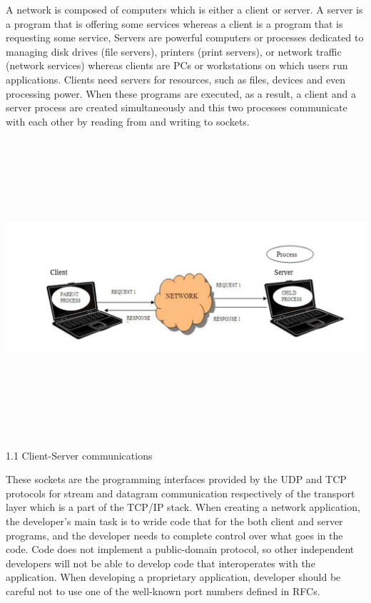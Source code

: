 \documentclass[12pt]{extarticle}
\begin{document}
A network is composed  of computers which is either a client or server. A server is a program that
is offering some services whereas a client is a program that is requesting some service, Servers are powerful
computers or processes dedicated to managing disk drives (file servers), printers (print servers), or
network traffic (network services) whereas clients are PCs or workstations on which users run applications.
Clients need servers for resources, such as files, devices and even processing power. When these programs are 
executed, as a result, a client and a server process are created simultaneously and this two processes 
communicate with each other by reading from and writing to sockets.

\begin{center}

\includegraphics[width=15cm, height=11cm]{client-server communication}

    1.1 Client-Server communications

\end{center}

These sockets are the programming interfaces provided by the UDP and TCP protocols
for stream and datagram communication respectively of the transport layer which is
a part of the TCP/IP stack. When creating a network application, the developer's 
main task is to wride code that for the both client and server programs, and the 
developer needs to complete control over what goes in the code. Code does not implement
a public-domain protocol, so other independent developers will not be able to develop code
that interoperates with the application. When developing a proprietary application,
developer should be careful not to use one of the well-known port numbers defined in RFCs.
\end{document}
